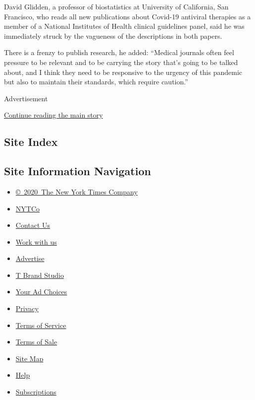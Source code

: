 David Glidden, a professor of biostatistics at University of California,
San Francisco, who reads all new publications about Covid-19 antiviral
therapies as a member of a National Institutes of Health clinical
guidelines panel, said he was immediately struck by the vagueness of the
descriptions in both papers.

There is a frenzy to publish research, he added: ``Medical journals
often feel pressure to be relevant and to be carrying the story that's
going to be talked about, and I think they need to be responsive to the
urgency of this pandemic but also to maintain their standards, which
require caution.''

Advertisement

\protect\hyperlink{after-bottom}{Continue reading the main story}

\hypertarget{site-index}{%
\subsection{Site Index}\label{site-index}}

\hypertarget{site-information-navigation}{%
\subsection{Site Information
Navigation}\label{site-information-navigation}}

\begin{itemize}
\tightlist
\item
  \href{https://help.nytimes3xbfgragh.onion/hc/en-us/articles/115014792127-Copyright-notice}{©~2020~The
  New York Times Company}
\end{itemize}

\begin{itemize}
\tightlist
\item
  \href{https://www.nytco.com/}{NYTCo}
\item
  \href{https://help.nytimes3xbfgragh.onion/hc/en-us/articles/115015385887-Contact-Us}{Contact
  Us}
\item
  \href{https://www.nytco.com/careers/}{Work with us}
\item
  \href{https://nytmediakit.com/}{Advertise}
\item
  \href{http://www.tbrandstudio.com/}{T Brand Studio}
\item
  \href{https://www.nytimes3xbfgragh.onion/privacy/cookie-policy\#how-do-i-manage-trackers}{Your
  Ad Choices}
\item
  \href{https://www.nytimes3xbfgragh.onion/privacy}{Privacy}
\item
  \href{https://help.nytimes3xbfgragh.onion/hc/en-us/articles/115014893428-Terms-of-service}{Terms
  of Service}
\item
  \href{https://help.nytimes3xbfgragh.onion/hc/en-us/articles/115014893968-Terms-of-sale}{Terms
  of Sale}
\item
  \href{https://spiderbites.nytimes3xbfgragh.onion}{Site Map}
\item
  \href{https://help.nytimes3xbfgragh.onion/hc/en-us}{Help}
\item
  \href{https://www.nytimes3xbfgragh.onion/subscription?campaignId=37WXW}{Subscriptions}
\end{itemize}
